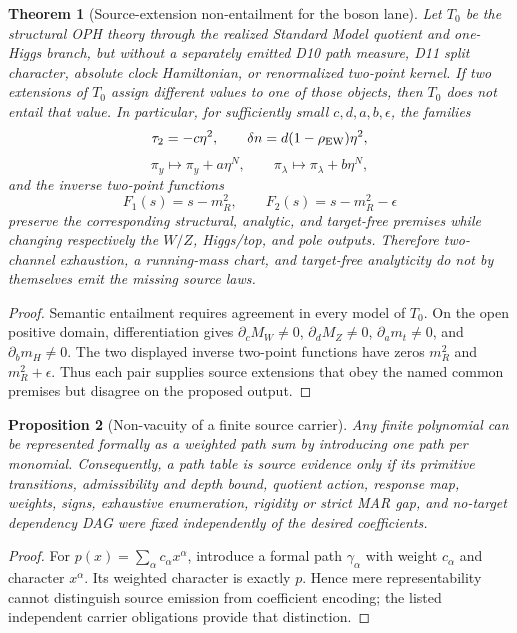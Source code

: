 \documentclass[11pt]{article}
\newtheorem{theorem}{Theorem}[section]
\newtheorem{proposition}[theorem]{Proposition}
\begin{document}
\begin{theorem}[Source-extension non-entailment for the boson
lane]\label{thm:boson-source-extension-no-go}
Let $T_0$ be the structural OPH theory through the realized Standard Model
quotient and one-Higgs branch, but without a separately emitted D10 path
measure, D11 split character, absolute clock Hamiltonian, or renormalized
two-point kernel. If two extensions of $T_0$ assign different values to one
of those objects, then $T_0$ does not entail that value. In particular, for
sufficiently small $c,d,a,b,\epsilon$, the families
\[
 \tau_2=-c\eta^2,\qquad
 \delta n=d(1-\rho_{\rm EW})\eta^2,
\]
\[
 \pi_y\mapsto\pi_y+a\eta^N,\qquad
 \pi_\lambda\mapsto\pi_\lambda+b\eta^N,
\]
and the inverse two-point functions
\[
 F_1(s)=s-m_R^2,\qquad F_2(s)=s-m_R^2-\epsilon
\]
preserve the corresponding structural, analytic, and target-free premises
while changing respectively the $W/Z$, Higgs/top, and pole outputs.
Therefore two-channel exhaustion, a running-mass chart, and target-free
analyticity do not by themselves emit the missing source laws.
\end{theorem}

\begin{proof}
Semantic entailment requires agreement in every model of $T_0$. On the open
positive domain, differentiation gives
\(\partial_c M_W\ne0\), \(\partial_d M_Z\ne0\),
\(\partial_a m_t\ne0\), and \(\partial_b m_H\ne0\). The two displayed inverse
two-point functions have zeros $m_R^2$ and $m_R^2+\epsilon$. Thus each pair
supplies source extensions that obey the named common premises but disagree on
the proposed output.
\end{proof}

\begin{proposition}[Non-vacuity of a finite source carrier]
Any finite polynomial can be represented formally as a weighted path sum by
introducing one path per monomial. Consequently, a path table is source
evidence only if its primitive transitions, admissibility and depth bound,
quotient action, response map, weights, signs, exhaustive enumeration,
rigidity or strict MAR gap, and no-target dependency DAG were fixed
independently of the desired coefficients.
\end{proposition}

\begin{proof}
For $p(x)=\sum_\alpha c_\alpha x^\alpha$, introduce a formal path
\(\gamma_\alpha\) with weight $c_\alpha$ and character $x^\alpha$. Its
weighted character is exactly $p$. Hence mere representability cannot
distinguish source emission from coefficient encoding; the listed independent
carrier obligations provide that distinction.
\end{proof}
\end{document}
